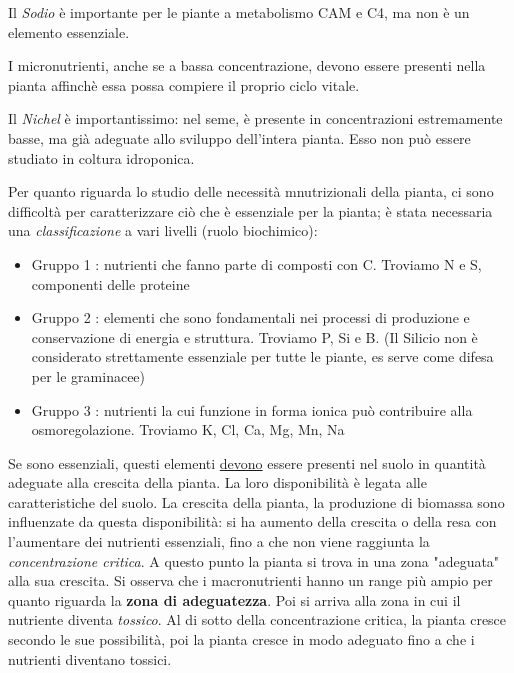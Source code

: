 \documentclass[a4paper,12pt]{book}
\begin{document}
Il \emph{Sodio} è importante per le piante a metabolismo CAM e C4, ma non è un elemento essenziale.

I micronutrienti, anche se a bassa concentrazione, devono essere presenti nella pianta affinchè essa possa compiere il proprio ciclo vitale.

Il \emph{Nichel} è importantissimo: nel seme, è presente in concentrazioni estremamente basse, ma già adeguate allo sviluppo dell'intera pianta. Esso non può essere studiato in coltura idroponica.

Per quanto riguarda lo studio delle necessità mnutrizionali della pianta, ci sono difficoltà per caratterizzare ciò che è essenziale per la pianta; è stata necessaria una \emph{classificazione} a vari livelli (ruolo biochimico):
\begin{itemize}
\item{Gruppo 1 : nutrienti che fanno parte di composti con C. Troviamo N e S, componenti delle proteine}
\item{Gruppo 2 : elementi che sono fondamentali nei processi di produzione e conservazione di energia e struttura. Troviamo P, Si e B. (Il Silicio non è considerato strettamente essenziale per tutte le piante, es serve come difesa per le graminacee)}
\item{Gruppo 3 : nutrienti la cui funzione in forma ionica può contribuire alla osmoregolazione. Troviamo K, Cl, Ca, Mg, Mn, Na}
\end{itemize}
Se sono essenziali, questi elementi \underline {devono} essere presenti nel suolo in quantità adeguate alla crescita della pianta. La loro disponibilità è legata alle caratteristiche del suolo. La crescita della pianta, la produzione di biomassa sono influenzate da questa disponibilità: si ha aumento della crescita o della resa con l'aumentare dei nutrienti essenziali, fino a che non viene raggiunta la \emph{concentrazione critica}. A questo punto la pianta si trova in una zona "adeguata" alla sua crescita. Si osserva che i macronutrienti hanno un range più ampio per quanto riguarda la \textbf{zona di adeguatezza}. Poi si arriva alla zona in cui il nutriente diventa \emph{tossico}. 
Al di sotto della concentrazione critica, la pianta cresce secondo le sue possibilità, poi la pianta cresce in modo adeguato fino a che i nutrienti diventano tossici.
\end{document}

